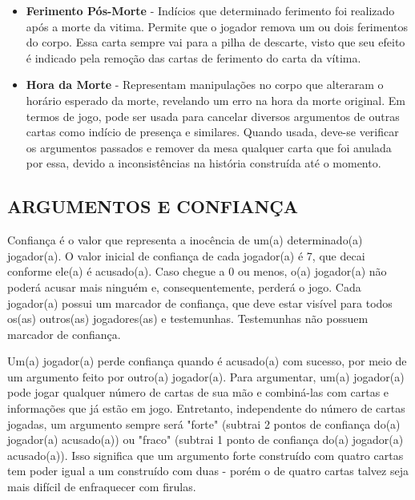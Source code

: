 \documentclass[a4paper, 11pt]{article}
\begin{document}
\begin{itemize}
			\item \textbf{Ferimento Pós-Morte} - Indícios que determinado ferimento foi realizado após a morte da vitima. Permite que o jogador remova um ou dois ferimentos do corpo. Essa carta sempre vai para a pilha de descarte, visto que seu efeito é indicado pela remoção das cartas de ferimento do carta da vítima.
			\item \textbf{Hora da Morte} - Representam manipulações no corpo que alteraram o horário esperado da morte, revelando um erro na hora da morte original. Em termos de jogo, pode ser usada para cancelar diversos argumentos de outras cartas como indício de presença e similares. Quando usada, deve-se verificar os argumentos passados e remover da mesa qualquer carta que foi anulada por essa, devido a inconsistências na história construída até o momento.
		\end{itemize}

\subsection*{ARGUMENTOS E CONFIANÇA}

	Confiança é o valor que representa a inocência de um(a) determinado(a) jogador(a). O valor inicial de confiança de cada jogador(a) é 7, que decai conforme ele(a) é acusado(a). Caso chegue a 0 ou menos, o(a) jogador(a) não poderá acusar mais ninguém e, consequentemente, perderá o jogo. Cada jogador(a) possui um marcador de confiança, que deve estar visível para todos os(as) outros(as) jogadores(as) e testemunhas. Testemunhas não possuem marcador de confiança.

	Um(a) jogador(a) perde confiança quando é acusado(a) com sucesso, por meio de um argumento feito por outro(a) jogador(a). Para argumentar, um(a) jogador(a) pode jogar qualquer número de cartas de sua mão e combiná-las com cartas e informações que já estão em jogo. Entretanto, independente do número de cartas jogadas, um argumento sempre será "forte" (subtrai 2 pontos de confiança do(a) jogador(a) acusado(a)) ou "fraco" (subtrai 1 ponto de confiança do(a) jogador(a) acusado(a)). Isso significa que um argumento forte construído com quatro cartas tem poder igual a um construído com duas - porém o de quatro cartas talvez seja mais difícil de enfraquecer com firulas.
\end{document}
